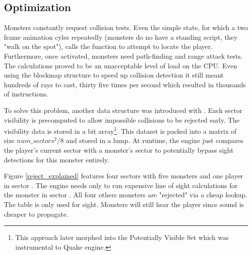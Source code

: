 \subsection{Optimization}
Monsters constantly request collision tests. Even the simple  state, for which a two frame animation cyles repeatedly (monsters do no have a standing script, they "walk on the spot"), calls the  function to attempt to locate the player. Furthermore, once activated, monsters need path-finding and range attack tests. The calculations proved to be an unacceptable level of load on the CPU. Even using the blockmap structure to speed up collision detection it still meant hundreds of rays to cast, thirty five times per second which resulted in thousands of instructions.\\
\par
To solve this problem, another data structure was introduced with . Each sector visibility is precomputed to allow impossible collisions to be rejected early. The visibility data is stored in a bit array\footnote{This approach later morphed into the Potentially Visible Set which was instrumental to Quake engine.}. This dataset is packed into a matrix of size $num\_sectors^2/8$ and stored in a  lump. At runtime, the engine just compares the player's current sector with a monster's sector to potentially bypass sight detections for this monster entirely.\\
\par
{}
\vspace{-7pt}
Figure \ref{reject_explained} features four sectors with five monsters and one player in sector . The engine needs only to run expensive line of sight calculations for the monster in sector . All four others monsters are "rejected" via a cheap lookup. The table is only used for sight. Monsters will still hear the player since sound is cheaper to propagate.\\
\par
{}






